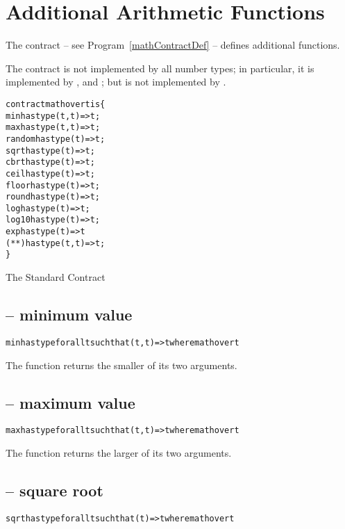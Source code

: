 \section{Additional Arithmetic Functions}
\label{mathContract}
The  contract -- see Program~\vref{mathContractDef} -- defines additional functions.

\begin{aside}
The  contract is not implemented by all number types; in particular, it is implemented by ,  and ; but is not implemented by .
\end{aside}

\begin{program}
\begin{alltt}
contract math over t is \{
  min has type (t,t)=>t;
  max has type (t,t)=>t;
  random has type (t)=>t;
  sqrt has type (t)=>t;
  cbrt has type (t)=>t;
  ceil has type (t)=>t;
  floor has type (t)=>t;
  round has type (t)=>t;
  log has type (t)=>t;
  log10 has type (t)=>t;
  exp has type (t)=>t
  (**) has type (t,t) => t;
\}
\end{alltt}
\caption{The Standard  Contract\label{mathContractDef}}
\end{program}

\subsection{ -- minimum value}
\begin{alltt}
min has type for all t such that (t,t)=>t where math over t
\end{alltt}

The  function returns the smaller of its two arguments.

\subsection{ -- maximum value}
\begin{alltt}
max has type for all t such that (t,t)=>t where math over t
\end{alltt}

The  function returns the larger of its two arguments.

\subsection{ -- square root}
\begin{alltt}
sqrt has type for all t such that (t)=>t where math over t
\end{alltt}


